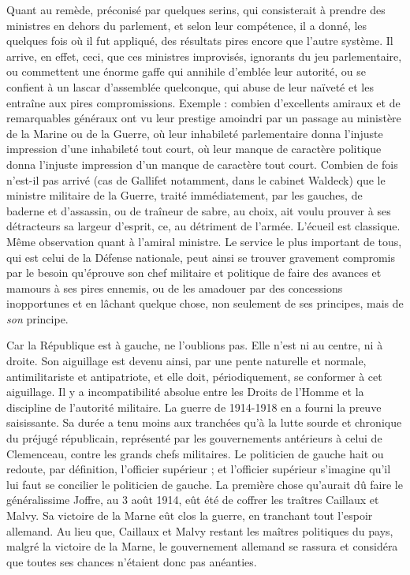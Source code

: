 \documentclass[french,twoside]{book} %
\begin{document}
Quant au remède, préconisé par quelques serins, qui consisterait à prendre des ministres en dehors du parlement, et selon leur compétence, il a donné, les quelques fois où il fut appliqué, des résultats pires encore que l’autre système. Il arrive, en effet, ceci, que ces ministres improvisés, ignorants du jeu parlementaire, ou commettent une énorme gaffe qui annihile d’emblée leur autorité, ou se confient à un lascar d’assemblée quelconque, qui abuse de leur naïveté et les entraîne aux pires compromissions. Exemple : combien d’excellents amiraux et de remarquables généraux ont vu leur prestige amoindri par un passage au ministère de la Marine ou de la Guerre, où leur inhabileté parlementaire donna l’injuste impression d’une inhabileté tout court, où leur manque de caractère politique donna l’injuste impression d’un manque de caractère tout court. Combien de fois n’est-il pas arrivé (cas de Gallifet notamment, dans le cabinet Waldeck) que le ministre militaire de la Guerre, traité immédiatement, par les gauches, de baderne et d’assassin, ou de traîneur de sabre, au choix, ait voulu prouver à ses détracteurs sa largeur d’esprit, ce, au détriment de l’armée. L’écueil est classique. Même observation quant à l’amiral ministre. Le service le plus important de tous, qui est celui de la Défense nationale, peut ainsi se trouver gravement compromis par le besoin qu’éprouve son chef militaire et politique de faire des avances et mamours à ses pires ennemis, ou de les amadouer par des concessions inopportunes et en lâchant quelque chose, non seulement de ses principes, mais de {\itshape son} principe.\par
Car la République est à gauche, ne l’oublions pas. Elle n’est ni au centre, ni à droite. Son aiguillage est devenu ainsi, par une pente naturelle et normale, antimilitariste et antipatriote, et elle doit, périodiquement, se conformer à cet aiguillage. Il y a incompatibilité absolue entre les Droits de l’Homme et la discipline de l’autorité militaire. La guerre de 1914-1918 en a fourni la preuve saisissante. Sa durée a tenu moins aux tranchées qu’à la lutte sourde et chronique du préjugé républicain, représenté par les gouvernements antérieurs à celui de Clemenceau, contre les grands chefs militaires. Le politicien de gauche hait ou redoute, par définition, l’officier supérieur ; et l’officier supérieur s’imagine qu’il lui faut se concilier le politicien de gauche. La première chose qu’aurait dû faire le généralissime Joffre, au 3 août 1914, eût été de coffrer les traîtres Caillaux et Malvy. Sa victoire de la Marne eût clos la guerre, en tranchant tout l’espoir allemand. Au lieu que, Caillaux et Malvy restant les maîtres politiques du pays, malgré la victoire de la Marne, le gouvernement allemand se rassura et considéra que toutes ses chances n’étaient donc pas anéanties.\par
\end{document}
